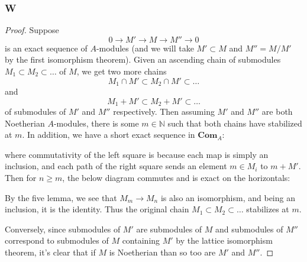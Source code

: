 \documentclass{article}
\newcommand{\N}{\mathbb{N}}
\newcommand{\id}{\mathrm{id}}
\newcommand{\Com}{\mathbf{Com}} %
\theoremstyle{definition} %
\begin{document}
\subsubsection{W}\label{3.6.W}
\begin{proof}
    Suppose 
    \[
    0\to M' \to M \to M'' \to 0
    \]
    is an exact sequence of $A$-modules (and we will take $M'\subset M$ and $M''=M/M'$ by the first isomorphism theorem). Given an ascending chain of submodules $M_1\subset M_2 \subset \dots$ of $M$, we get two more chains
    \[
    M_1\cap M' \subset M_2 \cap M' \subset \dots
    \]
    and
    \[
    M_1+M' \subset M_2+M'\subset \dots
    \]
    of submodules of $M'$ and $M''$ respectively. Then assuming $M'$ and $M''$ are both Noetherian $A$-modules, there is some $m\in \N$ such that both chains have stabilized at $m$. In addition, we have a short exact sequence in $\Com_A:$
    \begin{center}
    \end{center}
    where commutativity of the left square is because each map is simply an inclusion, and each path of the right square sends an element $m\in M_i$ to $m+M'$. Then for $n \ge m$, the below diagram commutes and is exact on the horizontals:
    \begin{center}
    \end{center}
    By the five lemma, we see that $M_m\to M_n$ is also an isomorphism, and being an inclusion, it is the identity. Thus the original chain $M_1\subset M_2 \subset \dots $ stabilizes at $m$.

    Conversely, since submodules of $M'$ are submodules of $M$ and submodules of $M''$ correspond to submodules of $M$ containing $M'$ by the lattice isomorphism theorem, it's clear that if $M$ is Noetherian than so too are $M'$ and $M''$.
\end{proof}
\end{document}
